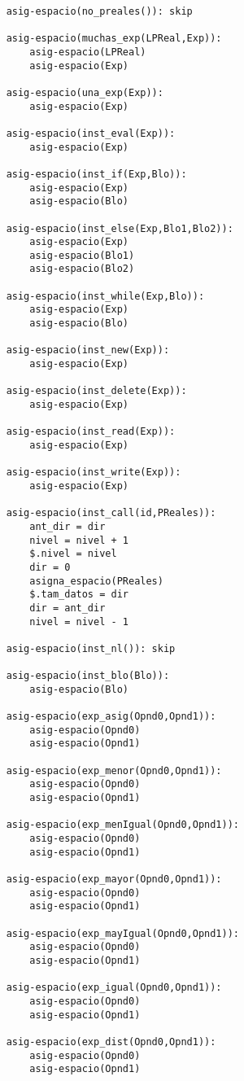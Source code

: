 \begin{lstlisting}
    asig-espacio(no_preales()): skip

    asig-espacio(muchas_exp(LPReal,Exp)):
        asig-espacio(LPReal)
        asig-espacio(Exp)

    asig-espacio(una_exp(Exp)):
        asig-espacio(Exp)

    asig-espacio(inst_eval(Exp)):
        asig-espacio(Exp)

    asig-espacio(inst_if(Exp,Blo)):
        asig-espacio(Exp)
        asig-espacio(Blo)

    asig-espacio(inst_else(Exp,Blo1,Blo2)):
        asig-espacio(Exp)
        asig-espacio(Blo1)
        asig-espacio(Blo2)

    asig-espacio(inst_while(Exp,Blo)):
        asig-espacio(Exp)
        asig-espacio(Blo)

    asig-espacio(inst_new(Exp)):
        asig-espacio(Exp)

    asig-espacio(inst_delete(Exp)):
        asig-espacio(Exp)

    asig-espacio(inst_read(Exp)):
        asig-espacio(Exp)

    asig-espacio(inst_write(Exp)):
        asig-espacio(Exp)

    asig-espacio(inst_call(id,PReales)):
        ant_dir = dir 
        nivel = nivel + 1
        $.nivel = nivel
        dir = 0 
        asigna_espacio(PReales)
        $.tam_datos = dir 
        dir = ant_dir 
        nivel = nivel - 1 

    asig-espacio(inst_nl()): skip

    asig-espacio(inst_blo(Blo)):
        asig-espacio(Blo)

    asig-espacio(exp_asig(Opnd0,Opnd1)):
        asig-espacio(Opnd0)
        asig-espacio(Opnd1)

    asig-espacio(exp_menor(Opnd0,Opnd1)):
        asig-espacio(Opnd0)
        asig-espacio(Opnd1)

    asig-espacio(exp_menIgual(Opnd0,Opnd1)):
        asig-espacio(Opnd0)
        asig-espacio(Opnd1)

    asig-espacio(exp_mayor(Opnd0,Opnd1)):
        asig-espacio(Opnd0)
        asig-espacio(Opnd1)

    asig-espacio(exp_mayIgual(Opnd0,Opnd1)):
        asig-espacio(Opnd0)
        asig-espacio(Opnd1)

    asig-espacio(exp_igual(Opnd0,Opnd1)):
        asig-espacio(Opnd0)
        asig-espacio(Opnd1)

    asig-espacio(exp_dist(Opnd0,Opnd1)):
        asig-espacio(Opnd0)
        asig-espacio(Opnd1)


\end{lstlisting}
